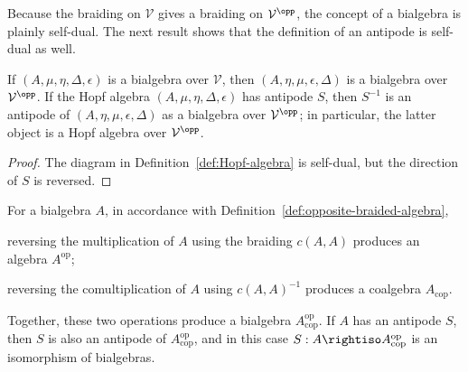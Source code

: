 Because the braiding on $\mathcal{V}$ gives a braiding on
$\mathcal{V}^{\opp}$, the concept of a bialgebra is plainly self-dual. The
next result shows that the definition of an antipode is self-dual as well.

\begin{proposition}\label{prop:bialgebra-duality}
	If $(A,\mu,\eta,\Delta,\epsilon)$ is a bialgebra over $\mathcal{V}$, then
	$(A,\eta,\mu,\epsilon,\Delta)$ is a bialgebra over
	$\mathcal{V}^{\opp}$. If the Hopf algebra
	$(A,\mu,\eta,\Delta,\epsilon)$ has antipode $S$, then $S^{-1}$ is an
	antipode of $(A,\eta,\mu,\epsilon,\Delta)$ as a bialgebra over
	$\mathcal{V}^{\opp}$; in particular, the latter object is a Hopf algebra
	over $\mathcal{V}^{\opp}$.
\end{proposition}

\begin{proof}
	The diagram in Definition~\ref{def:Hopf-algebra} is self-dual, but the
	direction of $S$ is reversed.
\end{proof}

\begin{proposition}\label{prop:Hopf-antiautomorphism}
	For a bialgebra $A$, in accordance with
	Definition~\ref{def:opposite-braided-algebra},
	\begin{compactitem}
		\item reversing the multiplication of $A$ using the braiding $c(A,A)$
		produces an algebra $A^{\mathrm{op}}$;
		\item reversing the comultiplication of $A$ using $c(A,A)^{-1}$
		produces a coalgebra $A_{\mathrm{cop}}$.
	\end{compactitem}
	Together, these two operations produce a bialgebra
	$A^{\mathrm{op}}_{\mathrm{cop}}$. If $A$ has an antipode $S$, then $S$ is
	also an antipode of $A^{\mathrm{op}}_{\mathrm{cop}}$, and in this case
	$S:A\rightiso A^{\mathrm{op}}_{\mathrm{cop}}$ is an isomorphism of
	bialgebras.
\end{proposition}

